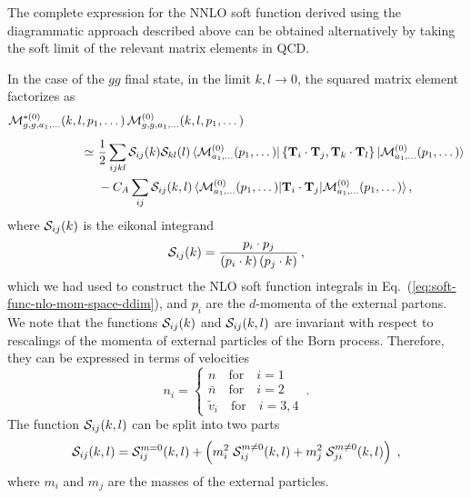 \documentclass[a4paper,11pt]{article}
\newcommand{\nbar}{\ensuremath{\bar{n}}}
\def\cT{\bm{\mathrm{T}}}
\def\cm{\mathcal{M}}
\def\la{\langle}
\def\ra{\rangle}
\numberwithin{equation}{section}
\begin{document}
The complete expression for the NNLO soft function derived using the
diagrammatic approach described above can be obtained alternatively by taking
the soft limit of the relevant matrix elements in QCD. 

In the case of the $gg$ final state, in the limit $k, l \to 0$, the squared
matrix element factorizes as~\cite{Czakon:2014oma}
%
\begin{align}
\cm^{*(0)}_{g,g,a_1,\dots}(k,l,p_1,\dots)\,
\cm^{(0)}_{g,g,a_1,\dots}(k,l,p_1,\dots)
\hspace{-120pt}
&
\nonumber \\[0.5em]
\simeq \
&
\frac{1}{2}\sum_{ijkl}{\cal S}_{ij}(k){\cal S}_{kl}(l) \,
\la\cm^{(0)}_{a_1,\dots}(p_1,\dots)|
\left\{\cT_i\cdot\cT_j, \cT_k\cdot\cT_l\right\} 
|\cm^{(0)}_{a_1,\dots}(p_1,\dots)\ra
\nonumber \\
&
-C_A\sum_{ij}{\cal S}_{ij}(k,l) \,
\la\cm^{(0)}_{a_1,\dots}(p_1,\dots)|\cT_i\cdot\cT_j
|\cm^{(0)}_{a_1,\dots}(p_1,\dots)\ra\,,
\label{eq:2cutmaster}
\end{align}
%
where ${\cal S}_{ij}(k)$ is the eikonal integrand
%
\begin{equation}
  {\cal S}_{ij}(k) = \frac{p_i \cdot p_j}{(p_i \cdot k)\, (p_j\cdot k)}\,,
  \label{eq:eikfun}
\end{equation}
%
which we had used to construct the NLO soft function integrals in
Eq.~(\ref{eq:soft-func-nlo-mom-space-ddim}), and $p_i$ are the $d$-momenta of
the external partons. 
%
We note that the functions ${\cal S}_{ij}(k)$ and ${\cal S}_{ij}(k,l)$ are
invariant with respect to rescalings of the momenta of external particles of the
Born process.  Therefore, they can be expressed in terms of velocities
%
\begin{equation}
  n_i = 
  \left\{
  \begin{array}{l}
     n     \quad \text{for} \quad    i = 1\, \\
     \nbar \quad \text{for} \quad    i = 2\, \\
     \tilde v_i   \quad \text{for} \quad \! i = 3, 4\,
  \end{array}
  \right..
\end{equation}
%
The function ${\cal S}_{ij}(k,l)$ can be split into two parts
%
\begin{equation}
  \label{eq:soft}
  {\cal S}_{ij}(k,l) = {\cal S}^{m=0}_{ij}(k,l) + \left( m_i^2
  \; {\cal S}^{m \neq 0}_{ij}(k,l) + m_j^2 \; {\cal S}^{m \neq
    0}_{ji}(k,l) \right) \; ,
\end{equation}
%
where $m_i$ and $m_j$ are the masses of the external particles.
\end{document}
